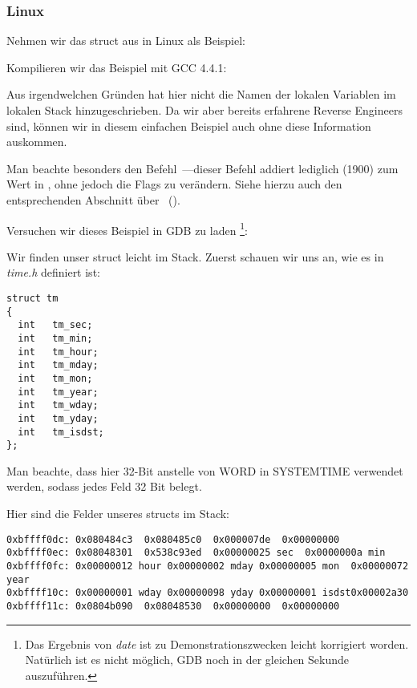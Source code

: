 \subsubsection{Linux}
Nehmen wir das struct  aus  in Linux als Beispiel:



Kompilieren wir das Beispiel mit GCC 4.4.1:


Aus irgendwelchen Gründen hat \IDA hier nicht die Namen der lokalen Variablen im lokalen Stack hinzugeschrieben.
Da wir aber bereits erfahrene Reverse Engineers sind, können wir in diesem einfachen Beispiel auch ohne diese
Information auskommen.

Man beachte besonders den Befehl~---dieser Befehl addiert lediglich  (1900) zum Wert
in \EAX, ohne jedoch die Flags zu verändern. Siehe hierzu auch den entsprechenden Abschnitt über
\LEA{}~().

Versuchen wir dieses Beispiel in GDB zu laden
\footnote{Das Ergebnis von \emph{date} ist zu Demonstrationszwecken leicht korrigiert worden. Natürlich ist es nicht
möglich, GDB noch in der gleichen Sekunde auszuführen.}:


Wir finden unser struct leicht im Stack.
Zuerst schauen wir uns an, wie es in \emph{time.h} definiert ist:

\begin{lstlisting}[caption=time.h, label=struct_tm,style=customc]
struct tm
{
  int	tm_sec;
  int	tm_min;
  int	tm_hour;
  int	tm_mday;
  int	tm_mon;
  int	tm_year;
  int	tm_wday;
  int	tm_yday;
  int	tm_isdst;
};
\end{lstlisting}
Man beachte, dass hier 32-Bit \Tint anstelle von WORD in SYSTEMTIME verwendet werden, sodass jedes Feld 32 Bit belegt.

Hier sind die Felder unseres structs im Stack:

\begin{lstlisting}
0xbffff0dc:	0x080484c3	0x080485c0	0x000007de	0x00000000
0xbffff0ec:	0x08048301	0x538c93ed	0x00000025 sec	0x0000000a min
0xbffff0fc:	0x00000012 hour	0x00000002 mday	0x00000005 mon 	0x00000072 year
0xbffff10c:	0x00000001 wday	0x00000098 yday	0x00000001 isdst0x00002a30
0xbffff11c:	0x0804b090	0x08048530	0x00000000	0x00000000
\end{lstlisting}

